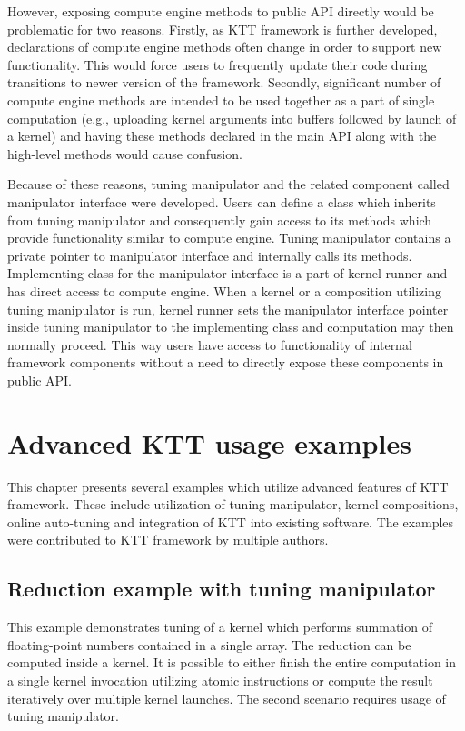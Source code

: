 \documentclass
[
    digital, %
    oneside, %
    table, %
    nolof, %
    nolot, %
    nocover %
]{fithesis3}
\begin{document}
However, exposing compute engine methods to public API directly would be problematic for two reasons. Firstly, as KTT framework is further developed,
declarations of compute engine methods often change in order to support new functionality. This would force users to frequently update their code
during transitions to newer version of the framework. Secondly, significant number of compute engine methods are intended to be used together as a part
of single computation (e.g., uploading kernel arguments into buffers followed by launch of a kernel) and having these methods declared in the main API
along with the high-level methods would cause confusion.

Because of these reasons, tuning manipulator and the related component called manipulator interface were developed. Users can define a class which
inherits from tuning manipulator and consequently gain access to its methods which provide functionality similar to compute engine. Tuning manipulator
contains a private pointer to manipulator interface and internally calls its methods. Implementing class for the manipulator interface is a part of
kernel runner and has direct access to compute engine. When a kernel or a composition utilizing tuning manipulator is run, kernel runner sets the
manipulator interface pointer inside tuning manipulator to the implementing class and computation may then normally proceed. This way users have access
to functionality of internal framework components without a need to directly expose these components in public API. 

\chapter{Advanced KTT usage examples}
\label{ktt-advanced-usage}
This chapter presents several examples which utilize advanced features of KTT framework. These include utilization of tuning manipulator, kernel
compositions, online auto-tuning and integration of KTT into existing software. The examples were contributed to KTT framework by multiple authors.

\section{Reduction example with tuning manipulator}
This example demonstrates tuning of a kernel which performs summation of floating-point numbers contained in a single array. The reduction can be
computed inside a kernel. It is possible to either finish the entire computation in a single kernel invocation utilizing atomic instructions or
compute the result iteratively over multiple kernel launches. The second scenario requires usage of tuning manipulator.
\end{document}
